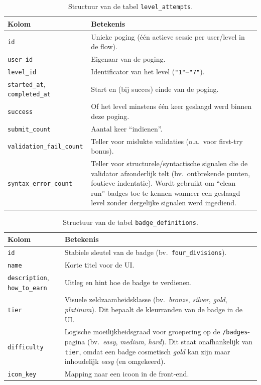 \begin{table}[H]
\centering
\small
\begin{tabularx}{\textwidth}{@{}l X@{}}
\hline
\textbf{Kolom} & \textbf{Betekenis} \\
\hline
\texttt{id} & Unieke poging (één actieve sessie per user/level in de flow). \\
\texttt{user\_id} & Eigenaar van de poging. \\
\texttt{level\_id} & Identificator van het level (\texttt{"1"}--\texttt{"7"}). \\
\texttt{started\_at}, \texttt{completed\_at} & Start en (bij succes) einde van de poging. \\
\texttt{success} & Of het level minstens één keer geslaagd werd binnen deze poging. \\
\texttt{submit\_count} & Aantal keer ``indienen''. \\
\texttt{validation\_fail\_count} & Teller voor mislukte validaties (o.a.\ voor first-try bonus). \\
\texttt{syntax\_error\_count} & Teller voor structurele/syntactische signalen die de validator afzonderlijk telt (bv.\ ontbrekende punten, foutieve indentatie). Wordt gebruikt om ``clean run''-badges toe te kennen wanneer een geslaagd level zonder dergelijke signalen werd ingediend. \\
\hline
\end{tabularx}
\caption{Structuur van de tabel \texttt{level\_attempts}.}
\label{tab:schema-level-attempts}
\end{table}

\begin{table}[H]
\centering
\small
\begin{tabularx}{\textwidth}{@{}l X@{}}
\hline
\textbf{Kolom} & \textbf{Betekenis} \\
\hline
\texttt{id} & Stabiele sleutel van de badge (bv.\ \texttt{four\_divisions}). \\
\texttt{name} & Korte titel voor de UI. \\
\texttt{description}, \texttt{how\_to\_earn} & Uitleg en hint hoe de badge te verdienen. \\
\texttt{tier} & Visuele zeldzaamheidsklasse (bv.\ \textit{bronze}, \textit{silver}, \textit{gold}, \textit{platinum}). Dit bepaalt de kleurranden van de badge in de UI. \\
\texttt{difficulty} & Logische moeilijkheidsgraad voor groepering op de \texttt{/badges}-pagina (bv.\ \textit{easy}, \textit{medium}, \textit{hard}). Dit staat onafhankelijk van \texttt{tier}, omdat een badge cosmetisch \textit{gold} kan zijn maar inhoudelijk \textit{easy} (en omgekeerd). \\
\texttt{icon\_key} & Mapping naar een icoon in de front-end. \\
\hline
\end{tabularx}
\caption{Structuur van de tabel \texttt{badge\_definitions}.}
\label{tab:schema-badge-definitions}
\end{table}

